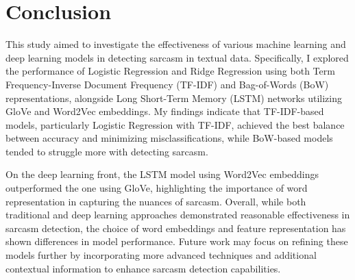 \section{Conclusion}

This study aimed to investigate the effectiveness of various machine learning and deep learning models in detecting sarcasm in textual data. 
Specifically, I explored the performance of Logistic Regression and Ridge Regression using both Term Frequency-Inverse Document Frequency (TF-IDF) and Bag-of-Words (BoW) representations, 
alongside Long Short-Term Memory (LSTM) networks utilizing GloVe and Word2Vec embeddings. My findings indicate that TF-IDF-based models, particularly Logistic Regression with TF-IDF, achieved 
the best balance between accuracy and minimizing misclassifications, while BoW-based models tended to struggle more with detecting sarcasm.

On the deep learning front, the LSTM model using Word2Vec embeddings outperformed the one using GloVe, highlighting the importance of word representation in capturing the nuances of sarcasm. 
Overall, while both traditional and deep learning approaches demonstrated reasonable effectiveness in sarcasm detection, the choice of word embeddings and feature representation has shown 
differences in model performance. Future work may focus on refining these models further by incorporating more advanced techniques and additional contextual information to enhance sarcasm 
detection capabilities.
